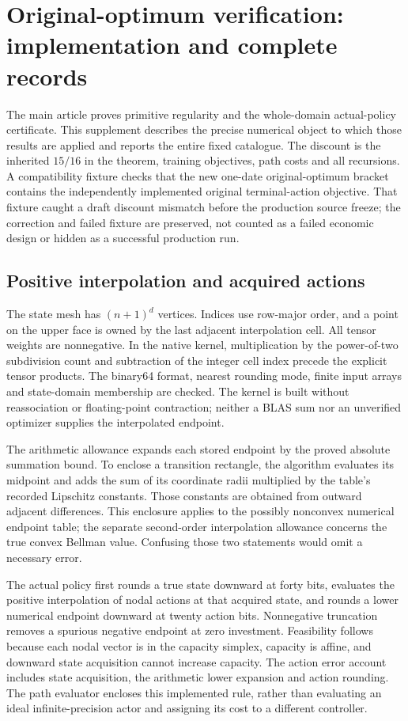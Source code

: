 \section{Original-optimum verification: implementation and complete records}\label{supp:accuracy62}
The main article proves primitive regularity and the whole-domain actual-policy certificate. This supplement describes the precise numerical object to which those results are applied and reports the entire fixed catalogue. The discount is the inherited $15/16$ in the theorem, training objectives, path costs and all recursions. A compatibility fixture checks that the new one-date original-optimum bracket contains the independently implemented original terminal-action objective. That fixture caught a draft discount mismatch before the production source freeze; the correction and failed fixture are preserved, not counted as a failed economic design or hidden as a successful production run.

\subsection{Positive interpolation and acquired actions}
The state mesh has $(n+1)^d$ vertices. Indices use row-major order, and a point on the upper face is owned by the last adjacent interpolation cell. All tensor weights are nonnegative. In the native kernel, multiplication by the power-of-two subdivision count and subtraction of the integer cell index precede the explicit tensor products. The binary64 format, nearest rounding mode, finite input arrays and state-domain membership are checked. The kernel is built without reassociation or floating-point contraction; neither a BLAS sum nor an unverified optimizer supplies the interpolated endpoint.

The arithmetic allowance expands each stored endpoint by the proved absolute summation bound. To enclose a transition rectangle, the algorithm evaluates its midpoint and adds the sum of its coordinate radii multiplied by the table's recorded Lipschitz constants. Those constants are obtained from outward adjacent differences. This enclosure applies to the possibly nonconvex numerical endpoint table; the separate second-order interpolation allowance concerns the true convex Bellman value. Confusing those two statements would omit a necessary error.

The actual policy first rounds a true state downward at forty bits, evaluates the positive interpolation of nodal actions at that acquired state, and rounds a lower numerical endpoint downward at twenty action bits. Nonnegative truncation removes a spurious negative endpoint at zero investment. Feasibility follows because each nodal vector is in the capacity simplex, capacity is affine, and downward state acquisition cannot increase capacity. The action error account includes state acquisition, the arithmetic lower expansion and action rounding. The path evaluator encloses this implemented rule, rather than evaluating an ideal infinite-precision actor and assigning its cost to a different controller.

